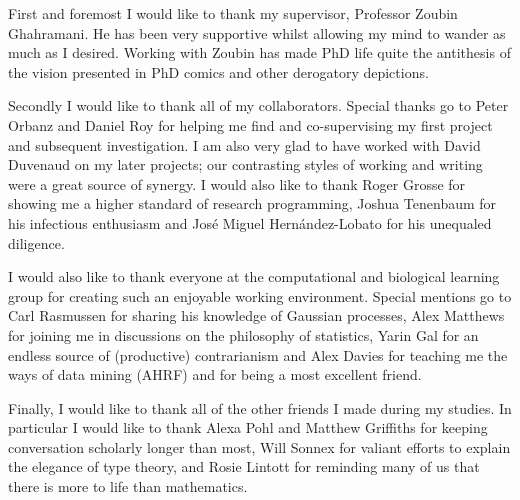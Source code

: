
\begin{acknowledgements}      

First and foremost I would like to thank my supervisor, Professor Zoubin Ghahramani.
He has been very supportive whilst allowing my mind to wander as much as I desired.
Working with Zoubin has made PhD life quite the antithesis of the vision presented in PhD comics and other derogatory depictions.

Secondly I would like to thank all of my collaborators.
Special thanks go to Peter Orbanz and Daniel Roy for helping me find and co-supervising my first project and subsequent investigation.
I am also very glad to have worked with David Duvenaud on my later projects; our contrasting styles of working and writing were a great source of synergy.
I would also like to thank Roger Grosse for showing me a higher standard of research programming, Joshua Tenenbaum for his infectious enthusiasm and Jos\'{e} Miguel Hern\'{a}ndez-Lobato for his unequaled diligence.

I would also like to thank everyone at the computational and biological learning group for creating such an enjoyable working environment.
Special mentions go to Carl Rasmussen for sharing his knowledge of Gaussian processes, Alex Matthews for joining me in discussions on the philosophy of statistics, Yarin Gal for an endless source of (productive) contrarianism and Alex Davies for teaching me the ways of data mining (AHRF) and for being a most excellent friend.

Finally, I would like to thank all of the other friends I made during my studies.
In particular I would like to thank Alexa Pohl and Matthew Griffiths for keeping conversation scholarly longer than most, Will Sonnex for valiant efforts to explain the elegance of type theory, and Rosie Lintott for reminding many of us that there is more to life than mathematics.

\end{acknowledgements}
